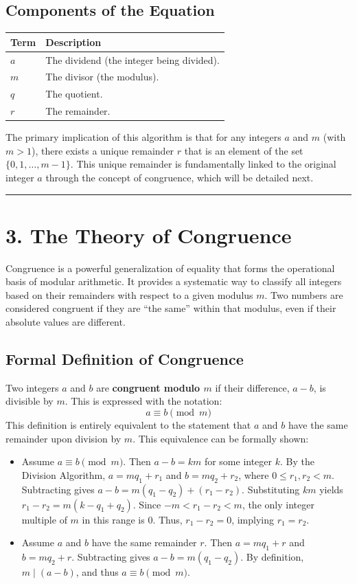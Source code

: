 \subsection*{Components of the Equation}
\begin{center}
\begin{tabular}{|l|l|}
\hline
\textbf{Term} & \textbf{Description} \\
\hline
$a$ & The dividend (the integer being divided). \\
\hline
$m$ & The divisor (the modulus). \\
\hline
$q$ & The quotient. \\
\hline
$r$ & The remainder. \\
\hline
\end{tabular}
\end{center}
The primary implication of this algorithm is that for any integers $a$ and $m$ (with $m > 1$), there exists a unique remainder $r$ that is an element of the set $\{0, 1, \dots, m-1\}$. This unique remainder is fundamentally linked to the original integer $a$ through the concept of congruence, which will be detailed next.

\hrule

\section*{3. The Theory of Congruence}
Congruence is a powerful generalization of equality that forms the operational basis of modular arithmetic. It provides a systematic way to classify all integers based on their remainders with respect to a given modulus $m$. Two numbers are considered congruent if they are ``the same'' within that modulus, even if their absolute values are different.

\subsection*{Formal Definition of Congruence}
Two integers $a$ and $b$ are \textbf{congruent modulo $m$} if their difference, $a - b$, is divisible by $m$. This is expressed with the notation:
$$ a \equiv b \pmod{m} $$
This definition is entirely equivalent to the statement that $a$ and $b$ have the same remainder upon division by $m$. This equivalence can be formally shown:
\begin{itemize}
    \item[($\Rightarrow$)] Assume $a \equiv b \pmod{m}$. Then $a - b = km$ for some integer $k$. By the Division Algorithm, $a = mq_1 + r_1$ and $b = mq_2 + r_2$, where $0 \leq r_1, r_2 < m$. Subtracting gives $a - b = m(q_1 - q_2) + (r_1 - r_2)$. Substituting $km$ yields $r_1 - r_2 = m(k - q_1 + q_2)$. Since $-m < r_1 - r_2 < m$, the only integer multiple of $m$ in this range is $0$. Thus, $r_1 - r_2 = 0$, implying $r_1 = r_2$.
    \item[($\Leftarrow$)] Assume $a$ and $b$ have the same remainder $r$. Then $a = mq_1 + r$ and $b = mq_2 + r$. Subtracting gives $a - b = m(q_1 - q_2)$. By definition, $m \mid (a - b)$, and thus $a \equiv b \pmod{m}$.
\end{itemize}

